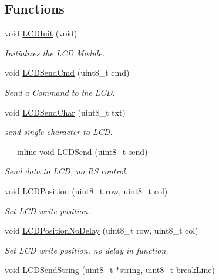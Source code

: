 \subsection*{Functions}
\begin{DoxyCompactItemize}
\item 
void \hyperlink{group__lcd__h_ga410f02e534a63d1f6e7a168dae003d6d}{L\-C\-D\-Init} (void)
\begin{DoxyCompactList}\small\item\em Initializes the L\-C\-D Module. \end{DoxyCompactList}\item 
void \hyperlink{group__lcd__h_gadf46506fd9d8c431334544aa11f4758d}{L\-C\-D\-Send\-Cmd} (uint8\-\_\-t cmd)
\begin{DoxyCompactList}\small\item\em Send a Command to the L\-C\-D. \end{DoxyCompactList}\item 
void \hyperlink{group__lcd__h_ga0d5843c7370917ec19391dd73542e4a6}{L\-C\-D\-Send\-Char} (uint8\-\_\-t txt)
\begin{DoxyCompactList}\small\item\em send single character to L\-C\-D. \end{DoxyCompactList}\item 
\-\_\-\-\_\-inline void \hyperlink{group__lcd__h_ga9bf60c90a000058abb09e96594144bf1}{L\-C\-D\-Send} (uint8\-\_\-t send)
\begin{DoxyCompactList}\small\item\em Send data to L\-C\-D, no R\-S control. \end{DoxyCompactList}\item 
void \hyperlink{group__lcd__h_gad4c66b9810c1c89a670b7c619a727cae}{L\-C\-D\-Position} (uint8\-\_\-t row, uint8\-\_\-t col)
\begin{DoxyCompactList}\small\item\em Set L\-C\-D write position. \end{DoxyCompactList}\item 
void \hyperlink{group__lcd__h_gaf22c7bb61db1d8632dd23b9803d00464}{L\-C\-D\-Position\-No\-Delay} (uint8\-\_\-t row, uint8\-\_\-t col)
\begin{DoxyCompactList}\small\item\em Set L\-C\-D write position, no delay in function. \end{DoxyCompactList}\item 
void \hyperlink{group__lcd__h_ga235609b6036ae1c877c66c70c9e1b962}{L\-C\-D\-Send\-String} (uint8\-\_\-t $\ast$string, uint8\-\_\-t break\-Line)

\end{DoxyCompactItemize}
